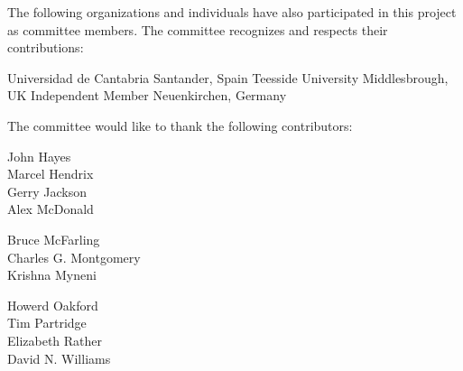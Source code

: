 The following organizations and individuals have also participated in
this project as committee members. The committee recognizes and
respects their contributions:

	{}	{Universidad de Cantabria}	{Santander, Spain}
		{}		{Teesside University}		{Middlesbrough, UK}
		{}			{Independent Member}		{Neuenkirchen, Germany}

The committee would like to thank the following contributors:

\begin{minipage}[t]{.3\linewidth}
John		Hayes \\
Marcel		Hendrix \\
Gerry		Jackson \\
Alex		McDonald \\
\end{minipage}
\hfill
\begin{minipage}[t]{.3\linewidth}
Bruce		McFarling \\
Charles G.	Montgomery \\
Krishna		Myneni \\
\end{minipage}
\hfill
\begin{minipage}[t]{.3\linewidth}
Howerd		Oakford \\
Tim			Partridge \\
Elizabeth	Rather \\
David N.	Williams \\
\end{minipage}